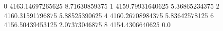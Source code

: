 0 4163.14697265625 8.71630859375
1 4159.79931640625 5.36865234375
2 4160.31591796875 5.88525390625
4 4160.26708984375 5.83642578125
6 4156.50439453125 2.07373046875
8 4154.4306640625 0.0
